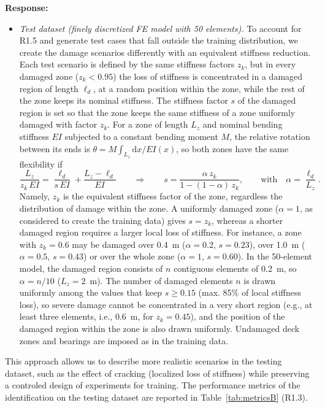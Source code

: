 \documentclass[11pt]{article}
\newenvironment{response}{\par\smallskip\noindent\color{resp}\textbf{Response:}\ }{\par}
\begin{document}
\begin{response}
\begin{itemize}[leftmargin=*]
\item \emph{Test dataset (finely discretized FE model with 50 elements).} To account for R1.5 and generate test cases that fall outside the training distribution, we create the damage scenarios differently with an equivalent stiffness reduction. 
Each test scenario is defined by the same stiffness factors $z_k$, but in every damaged zone ($z_k<0.95$) the loss of stiffness is concentrated in a damaged region of length $\ell_d$, at a random position within the zone, while the rest of the zone keeps its nominal stiffness.
The stiffness factor $s$ of the damaged region is set so that the zone keeps the same stiffness of a zone uniformly damaged with factor $z_k$.
For a zone of length $L_z$ and nominal bending stiffness $EI$ subjected to a constant bending moment $M$, the relative rotation between its ends is $\theta=M\int_{L_z}\mathrm{d}x/EI(x)$, so both zones have the same flexibility if
\begin{equation}
\frac{L_z}{z_k\,EI}=\frac{\ell_d}{s\,EI}+\frac{L_z-\ell_d}{EI}
\qquad\Longrightarrow\qquad
s=\frac{\alpha\,z_k}{1-(1-\alpha)\,z_k},\qquad\text{with}\quad\alpha=\frac{\ell_d}{L_z}.
\label{eq:localized}
\end{equation}
Namely, $z_k$ is the equivalent stiffness factor of the zone, regardless the distribution of damage within the zone.
A uniformly damaged zone ($\alpha=1$, as considered to create the training data) gives $s=z_k$, whereas a shorter damaged region requires a larger local loss of stiffness.
For instance, a zone with $z_k=0.6$ may be damaged over 0.4~m ($\alpha=0.2$, $s=0.23$), over 1.0~m ($\alpha=0.5$, $s=0.43$) or over the whole zone ($\alpha=1$, $s=0.60$).
In the 50-element model, the damaged region consists of $n$ contiguous elements of 0.2~m, so $\alpha=n/10$ ($L_z=2$~m).
The number of damaged elements $n$ is drawn uniformly among the values that keep $s\ge0.15$ (max. 85\% of local stiffness loss), so severe damage cannot be concentrated in a very short region (e.g., at least three elements, i.e., 0.6~m, for $z_k=0.45$), and the position of the damaged region within the zone is also drawn uniformly.
Undamaged deck zones and bearings are imposed as in the training data.
\end{itemize}
This approach allows us to describe more realistic scenarios in the testing dataset, such as the effect of cracking (localized loss of stiffness) while preserving a controled design of experiments for training.
The performance metrics of the identification on the testing dataset are reported in Table~\ref{tab:metricsB} (R1.3).
\end{response}
\end{document}
